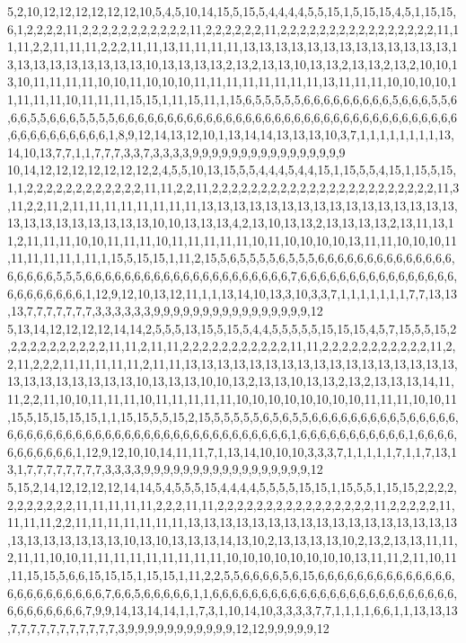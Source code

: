 5,2,10,12,12,12,12,12,12,10,5,4,5,10,14,15,5,15,5,4,4,4,4,5,5,15,1,5,15,15,4,5,1,15,15,6,1,2,2,2,2,11,2,2,2,2,2,2,2,2,2,2,2,11,2,2,2,2,2,2,11,2,2,2,2,2,2,2,2,2,2,2,2,2,2,2,2,11,11,11,2,2,11,11,11,2,2,2,11,11,13,11,11,11,11,13,13,13,13,13,13,13,13,13,13,13,13,13,13,13,13,13,13,13,13,13,13,10,13,13,13,13,2,13,2,13,13,10,13,13,2,13,13,2,13,2,10,10,13,10,11,11,11,11,10,10,11,10,10,10,11,11,11,11,11,11,11,11,13,11,11,11,10,10,10,10,11,11,11,11,10,11,11,11,15,15,1,11,15,11,1,15,6,5,5,5,5,5,6,6,6,6,6,6,6,6,6,5,6,6,6,5,5,6,6,6,5,5,6,6,6,5,5,5,5,6,6,6,6,6,6,6,6,6,6,6,6,6,6,6,6,6,6,6,6,6,6,6,6,6,6,6,6,6,6,6,6,6,6,6,6,6,6,6,6,6,6,6,6,6,1,8,9,12,14,13,12,10,1,13,14,14,13,13,13,10,3,7,1,1,1,1,1,1,1,1,13,14,10,13,7,7,1,1,7,7,7,3,3,7,3,3,3,3,9,9,9,9,9,9,9,9,9,9,9,9,9,9,9,9
10,14,12,12,12,12,12,12,12,2,4,5,5,10,13,15,5,5,4,4,4,5,4,4,15,1,15,5,5,4,15,1,15,5,15,1,1,2,2,2,2,2,2,2,2,2,2,2,2,11,11,2,2,11,2,2,2,2,2,2,2,2,2,2,2,2,2,2,2,2,2,2,2,2,2,2,2,11,3,11,2,2,11,2,11,11,11,11,11,11,11,11,13,13,13,13,13,13,13,13,13,13,13,13,13,13,13,13,13,13,13,13,13,13,13,13,13,10,10,13,13,13,4,2,13,10,13,13,2,13,13,13,13,2,13,11,13,11,2,11,11,11,10,10,11,11,11,10,11,11,11,11,11,10,11,10,10,10,10,13,11,11,10,10,10,11,11,11,11,11,1,11,1,15,5,15,15,1,11,2,15,5,6,5,5,5,5,6,5,5,5,6,6,6,6,6,6,6,6,6,6,6,6,6,6,6,6,6,6,6,5,5,5,6,6,6,6,6,6,6,6,6,6,6,6,6,6,6,6,6,6,6,6,6,7,6,6,6,6,6,6,6,6,6,6,6,6,6,6,6,6,6,6,6,6,6,6,6,6,1,12,9,12,10,13,12,11,1,1,13,14,10,13,3,10,3,3,7,1,1,1,1,1,1,1,7,7,13,13,13,7,7,7,7,7,7,7,3,3,3,3,3,3,9,9,9,9,9,9,9,9,9,9,9,9,9,9,9,9,12
5,13,14,12,12,12,12,14,14,2,5,5,5,13,15,5,15,5,4,4,5,5,5,5,5,15,15,15,4,5,7,15,5,5,15,2,2,2,2,2,2,2,2,2,2,2,11,11,2,11,11,2,2,2,2,2,2,2,2,2,2,2,11,11,2,2,2,2,2,2,2,2,2,2,2,11,2,2,11,2,2,2,11,11,11,11,11,2,11,11,13,13,13,13,13,13,13,13,13,13,13,13,13,13,13,13,13,13,13,13,13,13,13,13,13,10,13,13,13,10,10,13,2,13,13,10,13,13,2,13,2,13,13,13,14,11,11,2,2,11,10,10,11,11,11,10,11,11,11,11,11,10,10,10,10,10,10,10,10,11,11,11,10,10,11,15,5,15,15,15,15,1,1,15,15,5,5,15,2,15,5,5,5,5,5,6,5,6,5,5,6,6,6,6,6,6,6,6,6,5,6,6,6,6,6,6,6,6,6,6,6,6,6,6,6,6,6,6,6,6,6,6,6,6,6,6,6,6,6,6,6,6,6,6,1,6,6,6,6,6,6,6,6,6,6,6,1,6,6,6,6,6,6,6,6,6,6,6,1,12,9,12,10,10,14,11,11,7,1,13,14,10,10,10,3,3,3,7,1,1,1,1,1,7,1,1,7,13,13,1,7,7,7,7,7,7,7,7,3,3,3,3,9,9,9,9,9,9,9,9,9,9,9,9,9,9,9,9,9,12
5,15,2,14,12,12,12,12,14,14,5,4,5,5,5,15,4,4,4,4,5,5,5,5,15,15,1,15,5,5,1,15,15,2,2,2,2,2,2,2,2,2,2,2,11,11,11,11,11,2,2,2,11,11,2,2,2,2,2,2,2,2,2,2,2,2,2,2,2,2,11,2,2,2,2,2,11,11,11,11,2,2,11,11,11,11,11,11,11,13,13,13,13,13,13,13,13,13,13,13,13,13,13,13,13,13,13,13,13,13,13,13,13,10,13,10,13,13,13,14,13,10,2,13,13,13,13,10,2,13,2,13,13,11,11,2,11,11,10,10,11,11,11,11,11,11,11,11,11,10,10,10,10,10,10,10,10,13,11,11,2,11,10,11,11,15,15,5,6,6,15,15,15,1,15,15,1,11,2,2,5,5,6,6,6,6,5,6,15,6,6,6,6,6,6,6,6,6,6,6,6,6,6,6,6,6,6,6,6,6,6,6,6,7,6,6,5,6,6,6,6,6,1,1,6,6,6,6,6,6,6,6,6,6,6,6,6,6,6,6,6,6,6,6,6,6,6,6,6,6,6,6,6,6,6,6,6,7,9,9,14,13,14,14,1,1,7,3,1,10,14,10,3,3,3,3,7,7,1,1,1,1,6,6,1,1,13,13,13,7,7,7,7,7,7,7,7,7,7,7,3,9,9,9,9,9,9,9,9,9,9,9,12,12,9,9,9,9,9,12
